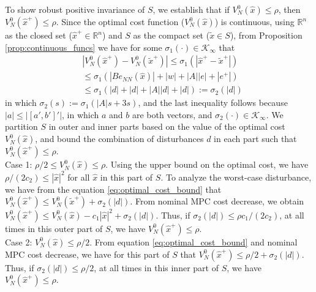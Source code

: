 \documentclass[preprint,5p, twocolumn, authoryear]{elsarticle}
\newcommand{\bbR}{\mathbb{R}}
\newcommand{\norm}[1]{\left| #1 \right|}
\newcommand{\xhat}{\hat{x}}
\begin{document}
To show robust positive invariance of $S$,  
we establish that if $V_N^0(\xhat) \leq \rho$, then $V_N^0(\xhat^+) \leq \rho$.
Since the optimal cost function ($V_N^0(\xhat)$) is continuous, using $\bbR^n$
as the closed set ($\xhat^+ \in \bbR^n$) and $S$ as the compact set ($\tilde{x}
\in S$), from Proposition \ref{prop:continuous_funcs} we have for some
$\sigma_1(\cdot) \in \mathcal{K}_{\infty}$ that
\begin{align}
    &\norm{V_N^0(\xhat^+) - V_N^0(\tilde{x}^+)} \leq 
    \sigma_1(\norm{\xhat^+ - \tilde{x}^+})  \nonumber  \\
    &\leq 
   \sigma_1(\norm{B e_{NN}(\xhat)} + \norm{w} + \norm{A}\norm{e} +  \norm{e^+}) \nonumber \\
     &\leq 
   \sigma_1(\norm{d} + \norm{d} + \norm{A}\norm{d} + \norm{d}) 
   := \sigma_2(\norm{d})
   \label{eq:optimal_cost_bound}
\end{align}
in which $\sigma_2(s) := \sigma_1(\norm{A} s +3s)$, and the last inequality
follows because $\norm{a} \leq \norm{[a', b']'}$, in which $a$ and $b$ are both
vectors, and $\sigma_2(\cdot) \in \mathcal{K}_{\infty}$. We partition $S$ in
outer and inner parts based on the value of the optimal cost $V_N^0(\xhat)$, and
bound the combination of disturbances $d$ in each part such that $V_N^0(\xhat^+)
\leq \rho$. \\
Case 1: $\rho/2 \leq V_N^0(\xhat) \leq \rho $. Using the upper bound on the
optimal cost, we have $\rho/(2c_2) \leq \norm{\xhat}^2$ for all $\xhat$ in this
part of $S$. To analyze the worst-case disturbance, we have from the equation
\eqref{eq:optimal_cost_bound} that $V_N^0(\xhat^+) \leq V_N^0(\tilde{x}^+) +
\sigma_2(\norm{d}) $. From nominal MPC cost decrease, we obtain  
$V_N^0(\xhat^+) \leq V_N^0(\xhat) - c_1\norm{\xhat}^2 + \sigma_2(\norm{d})$.
Thus, if $\sigma_2(\norm{d}) \leq \rho c_1/(2c_2)$, at all times in this outer
part of $S$, we have $V_N^0(\xhat^+) \leq \rho$. \\
Case 2: $V_N^0(\xhat) \leq \rho/2 $. From equation \eqref{eq:optimal_cost_bound}
and nominal MPC cost decrease, we have for this part of $S$ that $V_N^0(\xhat^+)
\leq \rho/2 + \sigma_2(\norm{d})$. Thus, if $\sigma_2(\norm{d}) \leq \rho/2$, at
all times in this inner part of $S$, we have $V_N^0(\xhat^+) \leq \rho$.
\end{document}
